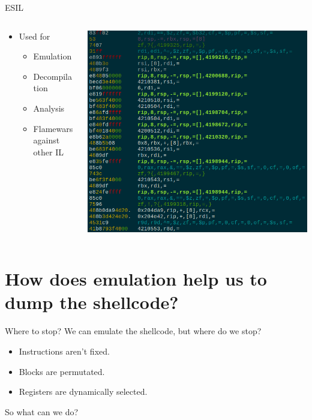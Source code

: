 \documentclass{beamer}
\begin{document}
\begin{frame}{ESIL}
	\begin{columns}
		\begin{column}{.4\textwidth}
			\begin{itemize}
				\item Used for
					\begin{itemize}[<+->]
						\item Emulation
						\item Decompilation
						\item Analysis
						\item Flamewars against other IL
					\end{itemize}
			\end{itemize}
		\end{column}
		\begin{column}{.6\textwidth}
			\includegraphics[width=\textwidth]{esil.png}
		\end{column}
	\end{columns}
\end{frame}

\section{How does emulation help us to dump the shellcode?}

\begin{frame}{Where to stop?}
	We can emulate the shellcode, but \alert{where} do we stop?
	\begin{itemize}
		\item Instructions aren't fixed.
		\item Blocks are permutated.
		\item Registers are dynamically selected.
	\end{itemize}
	\begin{center}
		So what can we do?
	\end{center}
\end{frame}
\end{document}
